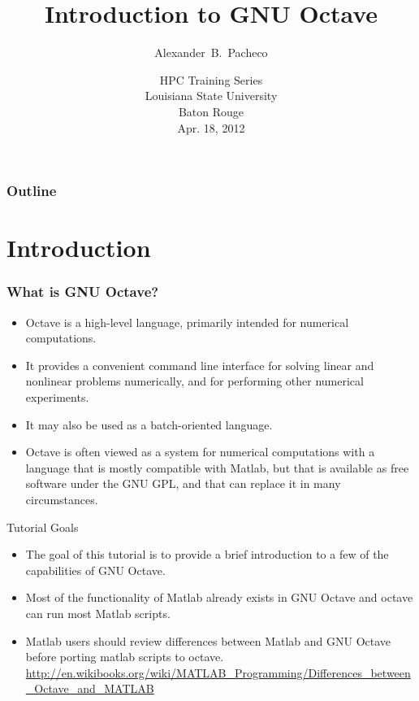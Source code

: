 \documentclass[slidestop,mathserif,compress,xcolor=svgnames]{beamer}
\title[GNU Octave]{Introduction to GNU Octave}
\author[Alex Pacheco]{\large{Alexander~B.~Pacheco}}
\institute[HPC@LSU - http://www.hpc.lsu.edu] {\inst{}\footnotesize{User Services Consultant\\LSU HPC \& LONI\\sys-help@loni.org}}
\date[{Apr. 18, 2012\hspace{2cm}}]{\scriptsize{HPC Training Series\\Louisiana State University\\Baton Rouge\\Apr. 18, 2012}}
\newenvironment{eblock}[0]
{
\begin{beamerboxesrounded}[upper=uppercol2,lower=lowercol2,shadow=true]}
{\end{beamerboxesrounded}}
\begin{document}
\scriptsize

\frame{\titlepage}

\begin{frame}[label=toc,squeeze]
  \footnotesize
  \frametitle{\small{Outline}}
  \tableofcontents
\end{frame}

\section{Introduction}
\begin{frame}
  \frametitle{\small What is GNU Octave?}
  \begin{itemize}
    \item Octave is a high-level language, primarily intended for numerical computations. 
    \item It provides a convenient command line interface for solving linear and nonlinear problems numerically, and for performing other numerical experiments. 
      \item It may also be used as a batch-oriented language.
      \item Octave is often viewed as a system for numerical computations with a language that is mostly compatible with Matlab, but that is available as free software under the GNU GPL, and that can replace it in many circumstances.
  \end{itemize}

  \begin{eblock}{Tutorial Goals}
    \begin{itemize}
      \item The goal of this tutorial is to provide a brief introduction to a few of the capabilities of GNU Octave.
      \item Most of the functionality of Matlab already exists in GNU Octave and octave can run most Matlab scripts.
      \item Matlab users should review differences between Matlab and GNU Octave before porting matlab scripts to octave. \url{http://en.wikibooks.org/wiki/MATLAB_Programming/Differences_between_Octave_and_MATLAB}
    \end{itemize}
  \end{eblock}
\end{frame}
\end{document}
